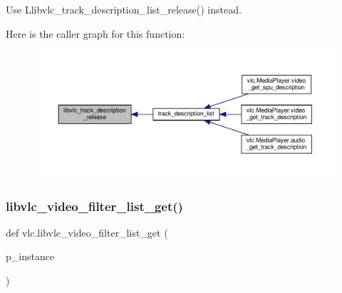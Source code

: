 \begin{DoxyVerb}\deprecated Use L{libvlc_track_description_list_release}() instead.
\end{DoxyVerb}
 Here is the caller graph for this function\+:
\nopagebreak
\begin{figure}[H]
\begin{center}
\leavevmode
\includegraphics[width=350pt]{namespacevlc_a7f44252e965f874e76b3c2f7a831d88d_icgraph}
\end{center}
\end{figure}
\mbox{\label{namespacevlc_a9a36ab0bc4560c42db45708f4c31e1f2}} 
\subsubsection{\texorpdfstring{libvlc\+\_\+video\+\_\+filter\+\_\+list\+\_\+get()}{libvlc\_video\_filter\_list\_get()}}
{\footnotesize\ttfamily def vlc.\+libvlc\+\_\+video\+\_\+filter\+\_\+list\+\_\+get (\begin{DoxyParamCaption}\item[{}]{p\+\_\+instance }\end{DoxyParamCaption})}

